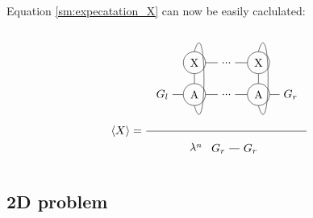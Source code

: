 Equation \cref{sm:expecatation_X} can now be easily caclulated:

\begin{equation}
    \Braket{X} = \frac{
        \begin{tikzpicture} [   ]
            \clip (-0.5,-1) rectangle (4.5,2);

            \node[] (N1) at (0,0) {$G_l$};
            \node[circle, draw] (N2) at (1,0) {A};
            \node[circle, draw] (X2) at (1,1) {X};

            \node[] (N3) at (2 ,0) {...};
            \node[] (X3) at (2,1) {...};

            \node[circle, draw] (N4) at (3 ,0) {A};
            \node[circle, draw] (X4) at (3,1) {X};

            \node[] (N5) at (4 ,0) {$G_r$};

            \draw  (N1) -- (N2) ;
            \draw  (N2) -- (N3) ;
            \draw  (N3) -- (N4) ;
            \draw  (N4) -- (N5) ;

            \draw  (X2) -- (X3) ;
            \draw  (X3) -- (X4) ;

            \draw  (N2) -- (X2) ;
            \draw  (N4) -- (X4) ;

            \draw (X2.north)   .. controls +(0.4,1.4) and +(0.4,-1.4) .. (N2.south);
            \draw (X4.north)   .. controls +(0.4,1.4) and +(0.4,-1.4) .. (N4.south);

        \end{tikzpicture}
    }{
        \lambda^n
        \begin{tikzpicture}[baseline={0cm-0.5*height("$=$")} ]
            \clip (-0.5,-0.5) rectangle (1.4,0.5);
            \node[] (N2) at (1,0) {$G_r$};
            \node[] (N1) at (0,0) {$G_r$};
            \draw  (N1) -- (N2) ;
        \end{tikzpicture}
    }
    \label{sm:expecatation_X_2}
\end{equation}

\subsection{2D problem}

